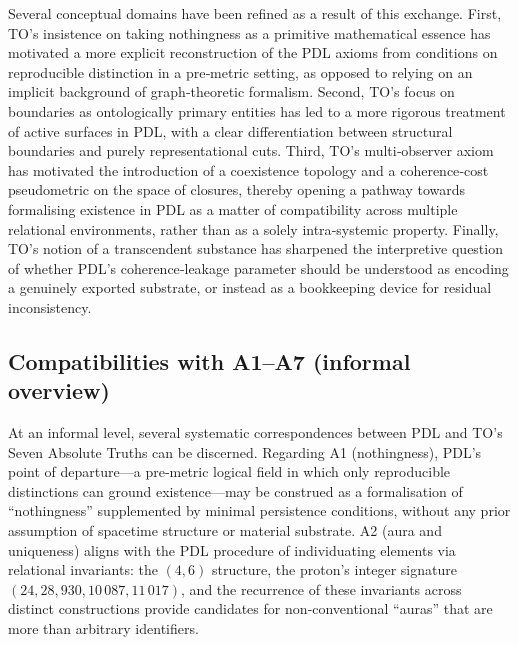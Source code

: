 \documentclass[11pt,a4paper]{article}
\begin{document}
Several conceptual domains have been refined as a result of this exchange. First, TO’s insistence on taking nothingness as a primitive mathematical essence has motivated a more explicit reconstruction of the PDL axioms from conditions on reproducible distinction in a pre‑metric setting, as opposed to relying on an implicit background of graph‑theoretic formalism.\cite{Laubscher2026IntroPDL,Laubscher2026DialogueTO} Second, TO’s focus on boundaries as ontologically primary entities has led to a more rigorous treatment of active surfaces in PDL, with a clear differentiation between structural boundaries and purely representational cuts.\cite{Laubscher2026FullPDL,Laubscher2026Alpha,Laubscher2026DialogueTO} Third, TO’s multi‑observer axiom has motivated the introduction of a coexistence topology and a coherence‑cost pseudometric on the space of closures, thereby opening a pathway towards formalising existence in PDL as a matter of compatibility across multiple relational environments, rather than as a solely intra‑systemic property.\cite{Laubscher2026TopologicalReformulation,Laubscher2026DialogueTO} Finally, TO’s notion of a transcendent substance has sharpened the interpretive question of whether PDL’s coherence‑leakage parameter should be understood as encoding a genuinely exported substrate, or instead as a bookkeeping device for residual inconsistency.\cite{Laubscher2026FullPDL,Laubscher2026Exponent18,Laubscher2026TopologicalReformulation}

\subsection{Compatibilities with A1--A7 (informal overview)}
At an informal level, several systematic correspondences between PDL and TO’s Seven Absolute Truths can be discerned.\cite{Laubscher2026DialogueTO} Regarding A1 (nothingness), PDL’s point of departure—a pre‑metric logical field in which only reproducible distinctions can ground existence—may be construed as a formalisation of “nothingness” supplemented by minimal persistence conditions, without any prior assumption of spacetime structure or material substrate.\cite{Laubscher2026IntroPDL,Laubscher2026FullPDL} A2 (aura and uniqueness) aligns with the PDL procedure of individuating elements via relational invariants: the $(4,6)$ structure, the proton’s integer signature $(24,28,930,10\,087,11\,017)$, and the recurrence of these invariants across distinct constructions provide candidates for non‑conventional “auras” that are more than arbitrary identifiers.\cite{Laubscher2026FullPDL,Laubscher2026CombinatorialProton}
\end{document}
